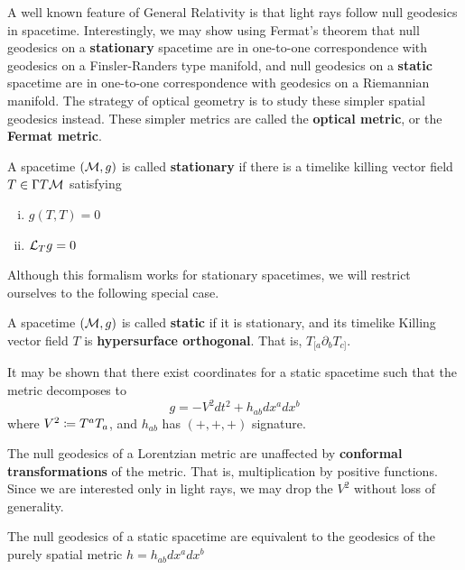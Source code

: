 %
A well known feature of General Relativity is that light rays follow null geodesics in spacetime.
Interestingly, we may show using Fermat's theorem \cite{PerlickV1990OFpi} that null geodesics on a \textbf{stationary} spacetime are in one-to-one correspondence with geodesics on a Finsler-Randers type manifold, and null geodesics on a \textbf{static} spacetime are in one-to-one correspondence with geodesics on a Riemannian manifold. The strategy of optical geometry is to study these simpler spatial geodesics instead. These simpler metrics are called the \textbf{optical metric}, or the \textbf{Fermat metric}.

\begin{definition}[]\label{}
A spacetime $(\mathcal{M}, g)$ is called \textbf{stationary} if there is a timelike killing vector field $T \in \Gamma T \mathcal{M}$ satisfying
%
\begin{enumerate}[i)]
  \item $g(T, T) = 0$
  \item $\mathcal{L}_Tg = 0$
\end{enumerate}
\end{definition}
%
Although this formalism works for stationary spacetimes, we will restrict ourselves to the following special case.
%
\begin{definition}[]\label{}
A spacetime $(\mathcal{M}, g)$ is called \textbf{static} if it is stationary, and its timelike Killing vector field $T$ is \textbf{hypersurface orthogonal}. That is, $T_{[a} \partial_b T_{c]}$.
\end{definition}
It may be shown \cite{straumann2012general} that there exist coordinates for a static spacetime such that the metric decomposes to
\begin{equation}\label{}
g = -V^2 dt^2 + h_{ab} dx^a dx^b
\end{equation}
where $V^2 \coloneqq T^a T_a$, and $h_{ab}$ has $(+, +, +)$ signature.
\begin{remark}[]\label{}
The null geodesics of a Lorentzian metric are unaffected by \textbf{conformal transformations} of the metric. That is, multiplication by positive functions. Since we are interested only in light rays, we may drop the $V^2$ without loss of generality.
\end{remark}
\begin{corollary}[]\label{}
The null geodesics of a static spacetime are equivalent to the geodesics of the purely spatial metric $h=h_{ab} dx^a dx^b$
\end{corollary}
